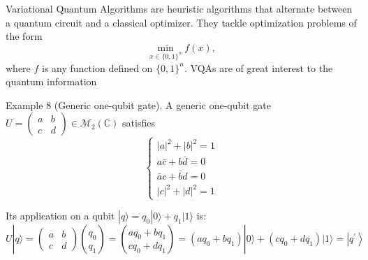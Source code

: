 Variational Quantum Algorithms are heuristic algorithms that alternate between a quantum circuit and a classical optimizer. They tackle optimization problems of the form
$$
\min _{x \in\{0,1\}^n} f(x),
$$
where $f$ is any function defined on $\{0,1\}^n$. VQAs are of great interest to the quantum information

Example 8 (Generic one-qubit gate). A generic one-qubit gate $U=\left(\begin{array}{ll}a & b \\ c & d\end{array}\right) \in \mathcal{M}_2(\mathbb{C})$ satisfies
$$
\left\{\begin{array}{l}
|a|^2+|b|^2=1 \\
a \bar{c}+b \bar{d}=0 \\
\bar{a} c+\bar{b} d=0 \\
|c|^2+|d|^2=1
\end{array}\right.
$$

Its application on a qubit $|q\rangle=q_0|0\rangle+q_1|1\rangle$ is:
$$
U|q\rangle=\left(\begin{array}{ll}
a & b \\
c & d
\end{array}\right)\binom{q_0}{q_1}=\binom{a q_0+b q_1}{c q_0+d q_1}=\left(a q_0+b q_1\right)|0\rangle+\left(c q_0+d q_1\right)|1\rangle=\left|q^{\prime}\right\rangle
$$
